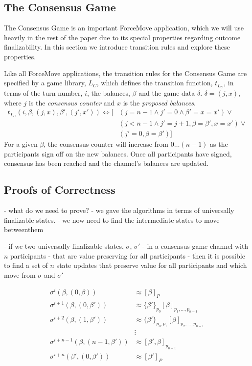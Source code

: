 \documentclass{article}
\begin{document}
\subsection{The Consensus Game}

The Consensus Game is an important ForceMove application, which we will use heavily in the rest of the paper due to its special properties regarding outcome finalizability. In this section we introduce transition rules and explore these properties.

Like all ForceMove applications, the transition rules for the Consensus Game are specified by a game library, $L_C$, which defines the transition function, $t_{L_C}$, in terms of the turn number, $i$, the balances, $\beta$ and the game data $\delta$. $\delta = (j, x)$, where $j$ is the \textit{consensus counter} and $x$ is the \textit{proposed balances}. 
\begin{align*}
  t_{L_C}(i, \beta, (j, x), \beta', (j', x')) \Leftrightarrow
    [ & (j=n-1 \wedge j'= 0 \wedge \beta' = x = x')  \vee \\
    & (j < n-1 \wedge j' = j+1, \beta = \beta', x = x') \vee \\
    & (j'=0, \beta = \beta') ]
\end{align*}
For a given $\beta$, the consensus counter will increase from $0\dots (n-1)$ as the participants sign off on the new balances. Once all participants have signed, consensus has been reached and the channel's balances are updated.


\subsection{Proofs of Correctness}

- what do we need to prove?
- we gave the algorithms in terms of universally finalizable states.
- we now need to find the intermediate states to move betweenthem

- if we two universally finalizable states, $\sigma$, $\sigma'$
- in a consensus game channel with $n$ participants
- that are value preserving for all participants
- then it is possible to find a set of $n$ state updates that preserve value for all participants and which move from $\sigma$ and $\sigma'$

  \begin{align*}
    \sigma^{i}(\beta, (0, \beta)) & \approx [\beta]_P \\
    \sigma^{i+1}(\beta, (0, \beta')) & \approx \{\beta'\}_{p_0}[\beta]_{p_1, ..., p_{n-1}} \\
    \sigma^{i+2}(\beta, (1, \beta')) & \approx \{\beta'\}_{p_0, p_1}[\beta]_{p_2, ..., p_{n-1}} \\
    &\vdots\\
    \sigma^{i+n-1}(\beta, (n-1, \beta')) & \approx [\beta', \beta]_{p_{n-1}} \\
    \sigma^{i+n}(\beta', (0, \beta')) & \approx [\beta']_{P} \\
  \end{align*}
\end{document}
